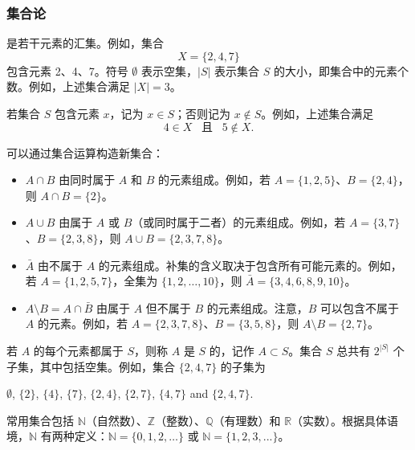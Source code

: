 \subsubsection{集合论}


是若干元素的汇集。例如，集合
\[X=\{2,4,7\}\]
包含元素 2、4、7。符号 $\emptyset$ 表示空集，$|S|$ 表示集合 $S$ 的大小，即集合中的元素个数。例如，上述集合满足 $|X|=3$。

若集合 $S$ 包含元素 $x$，记为 $x \in S$；否则记为 $x \notin S$。例如，上述集合满足
\[4 \in X \hspace{10pt}\textrm{且}\hspace{10pt} 5 \notin X.\]

\begin{samepage}
可以通过集合运算构造新集合：
\begin{itemize}
\item {} $A \cap B$ 由同时属于 $A$ 和 $B$ 的元素组成。例如，若 $A=\{1,2,5\}$、$B=\{2,4\}$，则 $A \cap B = \{2\}$。
\item {} $A \cup B$ 由属于 $A$ 或 $B$（或同时属于二者）的元素组成。例如，若 $A=\{3,7\}$、$B=\{2,3,8\}$，则 $A \cup B = \{2,3,7,8\}$。
\item {} $\bar A$ 由不属于 $A$ 的元素组成。补集的含义取决于包含所有可能元素的。例如，若 $A=\{1,2,5,7\}$，全集为 $\{1,2,\ldots,10\}$，则 $\bar A = \{3,4,6,8,9,10\}$。
\item {} $A \setminus B = A \cap \bar B$ 由属于 $A$ 但不属于 $B$ 的元素组成。注意，$B$ 可以包含不属于 $A$ 的元素。例如，若 $A=\{2,3,7,8\}$、$B=\{3,5,8\}$，则 $A \setminus B = \{2,7\}$。
\end{itemize}
\end{samepage}

若 $A$ 的每个元素都属于 $S$，则称 $A$ 是 $S$ 的，记作 $A \subset S$。集合 $S$ 总共有 $2^{|S|}$ 个子集，其中包括空集。例如，集合 $\{2,4,7\}$ 的子集为
\begin{center}
$\emptyset$,
$\{2\}$, $\{4\}$, $\{7\}$, $\{2,4\}$, $\{2,7\}$, $\{4,7\}$ and $\{2,4,7\}$.
\end{center}

常用集合包括 $\mathbb{N}$（自然数）、$\mathbb{Z}$（整数）、$\mathbb{Q}$（有理数）和 $\mathbb{R}$（实数）。根据具体语境，$\mathbb{N}$ 有两种定义：$\mathbb{N}=\{0,1,2,\ldots\}$ 或 $\mathbb{N}=\{1,2,3,...\}$。

